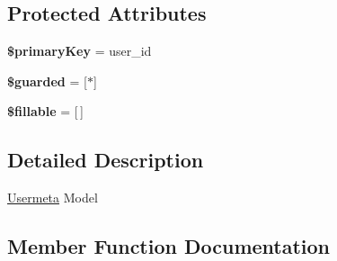\subsection*{Protected Attributes}
\begin{DoxyCompactItemize}
\item 
\hypertarget{classDMA_1_1Friends_1_1Models_1_1Usermeta_aa56e4c0a56649d707f5ccf13670e838c}{}{\bfseries \$primary\+Key} = \textquotesingle{}user\+\_\+id\textquotesingle{}\label{classDMA_1_1Friends_1_1Models_1_1Usermeta_aa56e4c0a56649d707f5ccf13670e838c}

\item 
\hypertarget{classDMA_1_1Friends_1_1Models_1_1Usermeta_a95d74f02cd302db9566b8da29154e82d}{}{\bfseries \$guarded} = \mbox{[}\textquotesingle{}$\ast$\textquotesingle{}\mbox{]}\label{classDMA_1_1Friends_1_1Models_1_1Usermeta_a95d74f02cd302db9566b8da29154e82d}

\item 
\hypertarget{classDMA_1_1Friends_1_1Models_1_1Usermeta_a1dca0217848634cab6e2ad205804e351}{}{\bfseries \$fillable} = \mbox{[}$\,$\mbox{]}\label{classDMA_1_1Friends_1_1Models_1_1Usermeta_a1dca0217848634cab6e2ad205804e351}

\end{DoxyCompactItemize}


\subsection{Detailed Description}
\hyperlink{classDMA_1_1Friends_1_1Models_1_1Usermeta}{Usermeta} Model 

\subsection{Member Function Documentation}
\hypertarget{classDMA_1_1Friends_1_1Models_1_1Usermeta_a9cfb688f15d66ee5a34c6437316d5d71}{}
